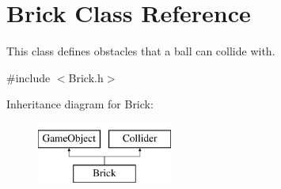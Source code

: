 \hypertarget{class_brick}{}\section{Brick Class Reference}
\label{class_brick}


This class defines obstacles that a ball can collide with.  




{\ttfamily \#include $<$Brick.\+h$>$}

Inheritance diagram for Brick\+:\begin{figure}[H]
\begin{center}
\leavevmode
\includegraphics[height=2.000000cm]{class_brick}
\end{center}
\end{figure}

